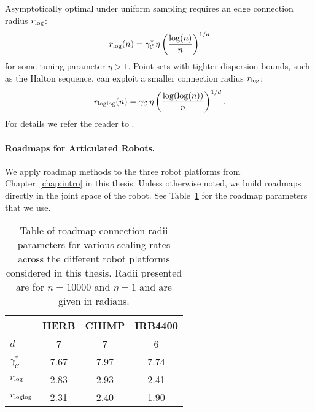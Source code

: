 Asymptotically optimal under uniform sampling requires
an edge connection radius $r_{\mbox{\scriptsize log}}$:
\begin{equation}
   r_{\mbox{\scriptsize log}}(n) =  \gamma^*_{\mathcal{C}} \, \eta
      \left( \frac{\log(n)}{n} \right)^{1/d}
\end{equation}
for some tuning parameter $\eta > 1$.
Point sets with tighter dispersion bounds,
such as the Halton sequence,
can exploit a smaller connection radius $r_{\mbox{\scriptsize log}}$:
\begin{equation}
   r_{\mbox{\scriptsize loglog}}(n) = \gamma_{\mathcal{C}} \, \eta
      \left( \frac{\log(\log(n))}{n} \right)^{1/d}.
\end{equation}
For details we refer the reader
to \citep{janson2015deterministicsampling}.

\paragraph{Roadmaps for Articulated Robots.}
We apply roadmap methods to the three robot platforms
from Chapter~\ref{chap:intro} in this thesis.
Unless otherwise noted,
we build roadmaps directly in the joint space of the robot.
See Table~\ref{table:roadmap-params} for the roadmap parameters
that we use.

\begin{table}
   \centering
   \begin{tabular}{lccc}
      \toprule
      & HERB & CHIMP & IRB4400 \\
      \midrule
      $d$ & 7 & 7 & 6 \\
      $\gamma^*_{\mathcal{C}}$ & 7.67 & 7.97 & 7.74 \\
      $r_{\mbox{\scriptsize log}}$ & 2.83 & 2.93 & 2.41 \\
      $r_{\mbox{\scriptsize loglog}}$ & 2.31 & 2.40 & 1.90 \\
      \bottomrule
   \end{tabular}
   \caption{Table of roadmap connection radii parameters for
      various scaling rates across the different robot platforms
      considered in this thesis.
      Radii presented are for $n=10000$ and $\eta = 1$
      and are given in radians.}
   \label{table:roadmap-params}
\end{table}

